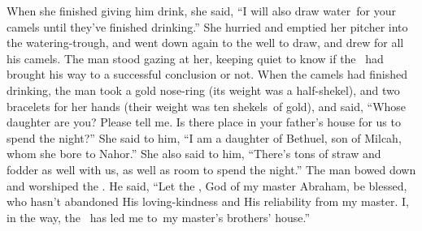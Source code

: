 \begin{inparaenum}
   When she finished giving him drink, she said, ``I will also draw water\understood\ for your camels until they've finished drinking.''%
   She hurried and emptied her pitcher into the watering-trough, and went down again to the well to draw, and drew for all his camels.%
   The man stood gazing at her, keeping quiet to know if the \lord\ had brought his way to a successful conclusion or not.%
   When the camels had finished drinking, the man took a gold nose-ring (its weight was a half-shekel), and two bracelets for her hands (their weight was ten shekels\understood\ of gold),%
   and said, ``Whose daughter are you? Please tell me. Is there place in your father's house for us to spend the night?''%
   She said to him, ``I am a daughter of Bethuel, son of Milcah, whom she bore to Nahor.''%
   She also said to him, ``There's tons of straw and fodder as well with us, as well as room to spend the night.''%
   The man bowed down and worshiped the \lord.%
   He said, ``Let the \lord, God of my master Abraham, be blessed, who hasn't abandoned His loving-kindness and His reliability from my master. I, in the way, the \lord\ has led me to\understood\ my master's brothers' house.''%
  

\end{inparaenum}
